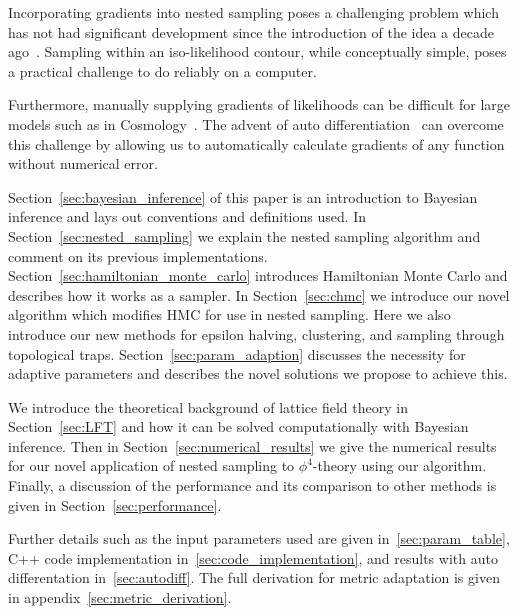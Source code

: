 \documentclass[11pt]{article}
\begin{document}
    Incorporating gradients into nested sampling poses a challenging problem which has not had significant development
    since the introduction of the idea a decade ago~\cite{Betancourt_NS_CHMC, GMC}.
    Sampling within an iso-likelihood contour, while conceptually simple, poses a practical challenge to do reliably on
    a computer.

    Furthermore, manually supplying gradients of likelihoods can be difficult for large models such as in
    Cosmology~\cite{plank2018, Handley_2015}.
    The advent of auto differentiation~\cite{NEURIPS2020_9332c513, 10.1145/3458817.3476165, 10.5555/3571885.3571964}
    can overcome this challenge by allowing us to automatically calculate gradients of any function without
    numerical error.

    Section~\ref{sec:bayesian_inference} of this paper is an introduction to Bayesian inference and lays out conventions
    and definitions used.
    In Section~\ref{sec:nested_sampling} we explain the nested sampling algorithm and comment on its
    previous implementations.
    Section~\ref{sec:hamiltonian_monte_carlo} introduces Hamiltonian Monte Carlo and describes how it works as a sampler.
    In Section~\ref{sec:chmc} we introduce our novel algorithm which modifies HMC for use in nested sampling.
    Here we also introduce our new methods for epsilon halving, clustering, and sampling through topological traps.
    Section~\ref{sec:param_adaption} discusses the necessity for adaptive parameters and describes
    the novel solutions we propose to achieve this.

    We introduce the theoretical background of lattice field theory in Section~\ref{sec:LFT} and how it can be
    solved computationally with Bayesian inference.
    Then in Section~\ref{sec:numerical_results} we give the numerical results for our novel application of nested
    sampling to $\phi^4$-theory using our algorithm.
    Finally, a discussion of the performance and its comparison to other methods is given in Section~\ref{sec:performance}.

    Further details such as the input parameters used are given in~\cref{sec:param_table},
    C++ code implementation in~\cref{sec:code_implementation}, and results with auto differentation in~\cref{sec:autodiff}.
    The full derivation for metric adaptation is given in appendix~\ref{sec:metric_derivation}.
\end{document}
